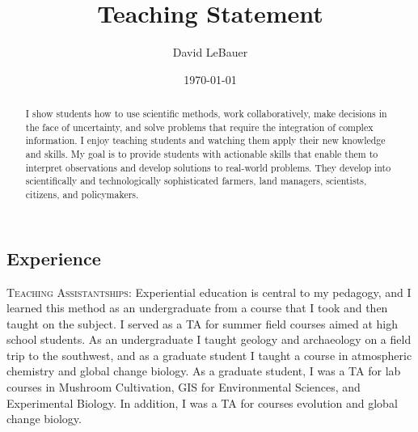 \documentclass[english]{tufte-handout}
\title[LeBauer Teaching Statement]{Teaching Statement}
\author{David LeBauer}\date{\today}
\providecommand\mynewthought[1]{%
   \addvspace{0.5em}%
   \noindent\hspace{-0.5em}\textsc{#1} %
}
\begin{document}
\maketitle


\begin{fullwidth}
\vspace{1.15em}

\begin{abstract}

I show students how to use scientific methods, work collaboratively, make decisions in the face of uncertainty, and solve problems that require the integration of complex information. 
I enjoy teaching students and watching them apply their new knowledge and skills.
My goal is to provide students with actionable skills that enable them to interpret observations and develop solutions to real-world problems.
They develop into scientifically and technologically sophisticated farmers, land managers, scientists, citizens, and policymakers.
\end{abstract}


\section{Experience}

 \mynewthought{Teaching Assistantships:} Experiential education is central to my pedagogy, and I learned this method as an undergraduate from a course that I took and then taught on the subject.
 I served as a TA for summer field courses aimed at high school students. As an undergraduate I taught geology and archaeology on a field trip to the southwest, and as a graduate student I taught a course in atmospheric chemistry and global change biology.
 As a graduate student, I was a TA for lab courses in Mushroom Cultivation, GIS for Environmental Sciences, and Experimental Biology. 
 In addition, I was a TA for courses evolution and global change biology. 


\end{fullwidth}
\end{document}
